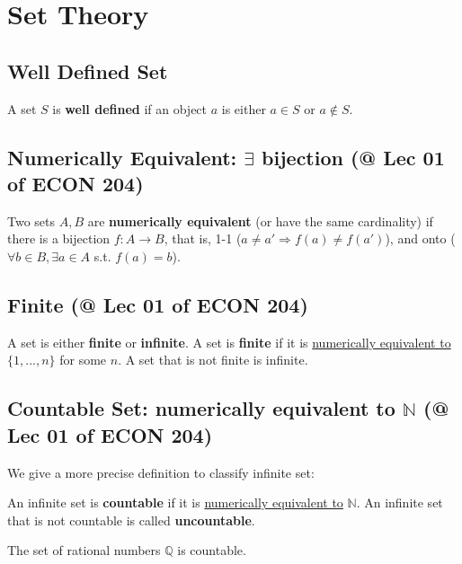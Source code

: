 \documentclass[11pt]{elegantbook}
\begin{document}
\section{Set Theory}
\subsection{Well Defined Set}
\begin{definition}
    A set $S$ is \textbf{well defined} if an object $a$ is either $a\in S$ or $a\notin S$.
\end{definition}

\subsection{Numerically Equivalent: $\exists$ bijection \small{(@ Lec 01 of ECON 204)}}
\begin{definition}
\normalfont
    Two sets $A, B$ are \textbf{numerically equivalent} (or have the same cardinality) if there is a bijection $f : A \rightarrow B$, that is, 1-1 ($a \neq a' \Rightarrow f(a) \neq f(a')$), and onto ($\forall b\in B, \exists a\in A$ s.t. $f(a)=b$).
\end{definition}

\subsection{Finite \small{(@ Lec 01 of ECON 204)}}
\begin{definition}
\normalfont
    A set is either \textbf{finite} or \textbf{infinite}. A set is \textbf{finite} if it is \underline{numerically equivalent to} $\{1,...,n\}$ for some $n$. A set that is not finite is infinite.
\end{definition}

\subsection{Countable Set: numerically equivalent to $\mathbb{N}$ \small{(@ Lec 01 of ECON 204)}}
We give a more precise definition to classify infinite set:
\begin{definition}
\normalfont
    An infinite set is \textbf{countable} if it is \underline{numerically equivalent to} $\mathbb{N}$. An infinite set that is not countable is called \textbf{uncountable}.
\end{definition}

\begin{theorem}
    The set of rational numbers $\mathbb{Q}$ is countable.
\end{theorem}
\end{document}
